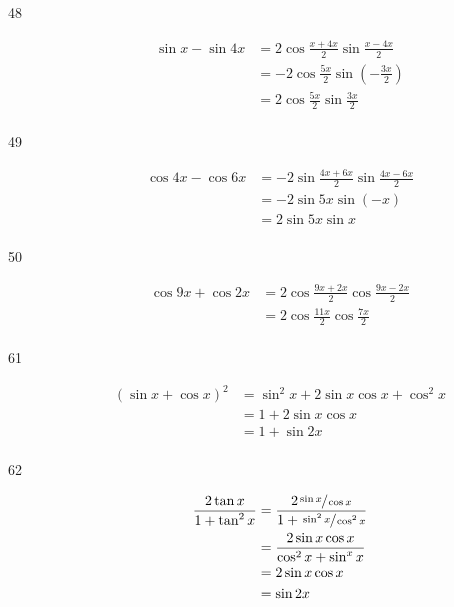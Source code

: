 \documentclass{exam}
\begin{document}
\begin{description}
      \item[48]
        \begin{align*}
          \sin x - \sin 4x & = 2 \cos \frac{x + 4x}{2} \sin \frac{x - 4x}{2} \\
                           & = - 2 \cos \frac{5x}{2} \sin \left( -\frac{3x}{2} \right) \\
                           & = \boxed{ 2 \cos \frac{5x}{2} \sin \frac{3x}{2} } \\
        \end{align*}

      \item[49]
        \begin{align*}
          \cos 4x - \cos 6x & = - 2 \sin \frac{4x + 6x}{2} \sin \frac{4x - 6x}{2} \\
                            & = -2 \sin 5x \sin (-x) \\
                            & = \boxed{ 2 \sin 5x \sin x } \\
        \end{align*}

      \item[50]
        \begin{align*}
          \cos 9x + \cos 2x & = 2 \cos \frac{9x + 2x}{2} \cos \frac{9x - 2x}{2} \\
                            & = \boxed{ 2 \cos \frac{11x}{2} \cos \frac{7x}{2} } \\
        \end{align*}

      \item[61]
        \begin{align*}
          (\sin x + \cos x)^2 & = \sin^2 x + 2 \sin x \cos x + \cos^2 x \\
                              & = 1 + 2 \sin x \cos x \\
                              & = 1 + \sin 2x \\
        \end{align*}

      \item[62]
        \begin{align*}
          \frac{2 \tan x}{1 + \tan^2 x} & = \frac{2 \sfrac{\sin x}{\cos x}}{1 + \sfrac{\sin^2 x}{\cos^2 x}} \\
                                        & = \frac{2 \sin x \cos x}{\cos^2 x + \sin^x x} \\
                                        & = 2 \sin x \cos x \\
                                        & = \sin 2x \\
        \end{align*}


\end{description}
\end{document}
